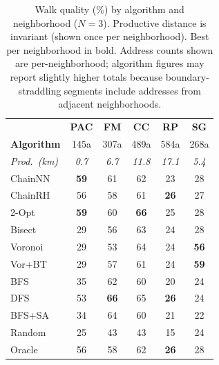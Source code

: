 \documentclass[conference]{IEEEtran}
\begin{document}
\begin{table}[htbp]
\caption{Walk quality (\%) by algorithm and neighborhood ($N=3$). Productive distance is invariant (shown once per neighborhood). Best per neighborhood in bold. Address counts shown are per-neighborhood; algorithm figures may report slightly higher totals because boundary-straddling segments include addresses from adjacent neighborhoods.}
\label{tab:master}
\begin{center}
\begin{tabular}{l ccccc}
\toprule
 & \textbf{PAC} & \textbf{FM} & \textbf{CC} & \textbf{RP} & \textbf{SG} \\
\textbf{Algorithm} & 145a & 307a & 489a & 584a & 268a \\
\midrule
\emph{Prod.\ (km)} & \emph{0.7} & \emph{6.7} & \emph{11.8} & \emph{17.1} & \emph{5.4} \\
\midrule
ChainNN  & \textbf{59} & 61 & 62 & 23 & 28 \\
ChainRH  & 56 & 58 & 61 & \textbf{26} & 27 \\
2-Opt    & \textbf{59} & 60 & \textbf{66} & 25 & 28 \\
Bisect   & 29 & 56 & 63 & 24 & 28 \\
Voronoi  & 29 & 53 & 64 & 24 & \textbf{56} \\
Vor+BT   & 29 & 57 & 61 & 24 & \textbf{59} \\
BFS      & 35 & 62 & 60 & 20 & 24 \\
DFS      & 53 & \textbf{66} & 65 & \textbf{26} & 24 \\
BFS+SA   & 34 & 64 & 60 & 21 & 22 \\
Random   & 25 & 43 & 43 & 15 & 24 \\
\midrule
Oracle   & 56 & 58 & 62 & \textbf{26} & 28 \\
\bottomrule
\end{tabular}
\end{center}
\end{table}
\end{document}
